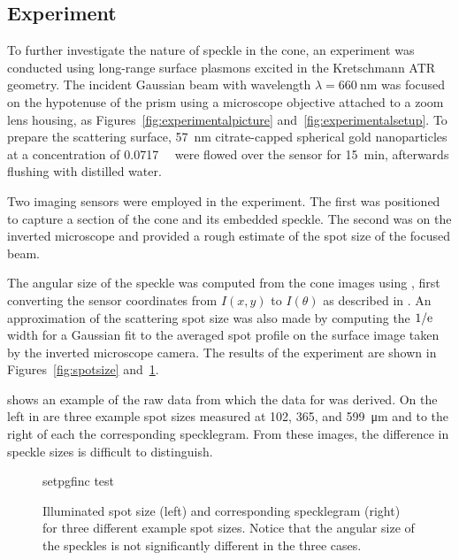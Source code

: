 \subsection{Experiment}\label{sec:specklesizeexpf}
To further investigate the nature of speckle in the cone, an experiment was
conducted using long-range surface plasmons excited in the Kretschmann ATR
geometry.  The incident Gaussian beam with wavelength $\lambda =
\SI{660}{\nano\meter}$ was focused on the hypotenuse of the prism using a
microscope objective attached to a zoom lens housing, as
Figures~\ref{fig:experimentalpicture} and~\ref{fig:experimentalsetup}.  To
prepare the scattering surface, \SI{57}{\nano\meter} citrate-capped spherical
gold nanoparticles at a concentration of \SI{0.0717}{\nano\Molar} were flowed
over the sensor for \SI{15}{\minute}, afterwards flushing with distilled
water.

Two imaging sensors were employed in the experiment.  The first was positioned
to capture a section of the cone and its embedded speckle.  The second was on
the inverted microscope and provided a rough estimate of the spot size of the
focused beam.

The angular size of the speckle was computed from the cone images using
, first converting the sensor coordinates from $I(x,y)$
to $I(\theta)$ as described in .  An approximation of the
scattering spot size was also made by computing the $1/{\mathrm{e}}$ width for a
Gaussian fit to the averaged spot profile on the surface image taken by the
inverted microscope camera.  The results of the experiment are shown in
Figures~\ref{fig:spotsize} and~\ref{fig:spotsizewspeckle}.  

 shows an example of the raw data from which the
data for  was derived.  On the left in
 are three example spot sizes measured at 102,
365, and \SI{599}{\micro\meter} and to the right of each the corresponding
specklegram.  From these images, the difference in speckle sizes is difficult
to distinguish.
\begin{figure}[ht]
\centering
{setpgfinc}
{test}
\caption{Illuminated spot size (left) and corresponding specklegram (right)
for three different example spot sizes.  Notice that the angular size of the
speckles is not significantly different in the three cases.}
\label{fig:spotsizewspeckle}
\end{figure}



